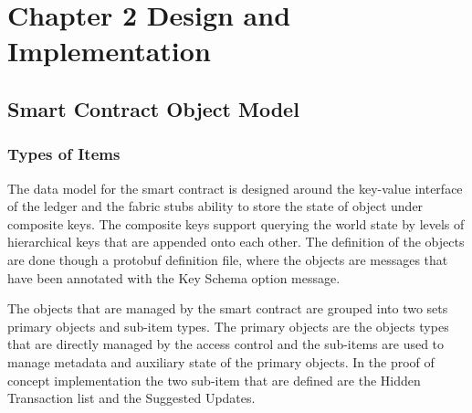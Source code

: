 \chapter{Chapter 2 Design and Implementation}





% 
\cite{qinBlockchainbasedAccessControl2021}

\section{Smart Contract Object Model}

\subsection{Types of Items}

The data model for the smart contract is designed around the key-value interface of the ledger and the fabric stubs  ability to store the state of object under composite keys. The composite keys support querying the world state by levels of hierarchical keys that are appended onto each other. The definition of the objects are done though a protobuf definition file, where the objects are messages that have been annotated with the Key Schema option message.

The objects that are managed by the smart contract are grouped into two sets primary objects and sub-item types. The primary objects are the objects types that are directly managed by the access control and the sub-items are used to manage metadata and auxiliary state of the primary objects. In the proof of concept implementation the two sub-item that are defined are the Hidden Transaction list and the Suggested Updates.


